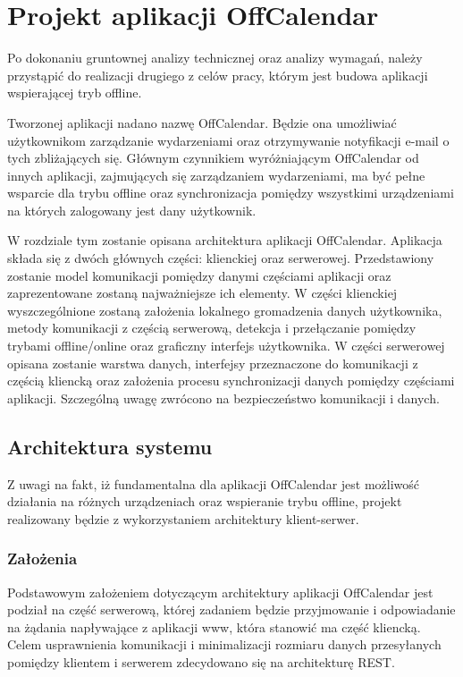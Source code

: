 \chapter{Projekt aplikacji OffCalendar}
\label{cha:proAppOff}

Po dokonaniu gruntownej analizy technicznej oraz analizy wymagań, należy przystąpić do realizacji drugiego z celów pracy, którym jest budowa aplikacji wspierającej tryb offline.

Tworzonej aplikacji nadano nazwę OffCalendar. Będzie ona umożliwiać użytkownikom zarządzanie wydarzeniami oraz otrzymywanie notyfikacji e-mail o tych zbliżających się. Głównym czynnikiem wyróżniającym OffCalendar od innych aplikacji, zajmujących się zarządzaniem wydarzeniami, ma być pełne wsparcie dla trybu offline oraz synchronizacja pomiędzy wszystkimi urządzeniami na których zalogowany jest dany użytkownik.

W rozdziale tym zostanie opisana architektura aplikacji OffCalendar. Aplikacja składa się z dwóch głównych części: klienckiej oraz serwerowej. Przedstawiony zostanie model komunikacji pomiędzy danymi częściami aplikacji oraz zaprezentowane zostaną najważniejsze ich elementy. W części klienckiej wyszczególnione zostaną założenia lokalnego gromadzenia danych użytkownika, metody komunikacji z częścią serwerową, detekcja i przełączanie pomiędzy trybami offline/online oraz graficzny interfejs użytkownika. W części serwerowej opisana zostanie warstwa danych, interfejsy przeznaczone do komunikacji z częścią kliencką oraz założenia procesu synchronizacji danych pomiędzy częściami aplikacji. Szczególną uwagę zwrócono na bezpieczeństwo komunikacji i danych.

\section{Architektura systemu}
\label{sec:archSys}

Z uwagi na fakt, iż fundamentalna dla aplikacji OffCalendar jest możliwość działania na różnych urządzeniach oraz wspieranie trybu offline, projekt realizowany będzie z wykorzystaniem architektury klient-serwer.

\subsection{Założenia}
\label{sec:zalozenia}

Podstawowym założeniem dotyczącym architektury aplikacji OffCalendar jest podział na część serwerową, której zadaniem będzie przyjmowanie i odpowiadanie na żądania napływające z aplikacji www, która stanowić ma część kliencką. Celem usprawnienia komunikacji i minimalizacji rozmiaru danych przesyłanych pomiędzy klientem i serwerem zdecydowano się na architekturę REST.

